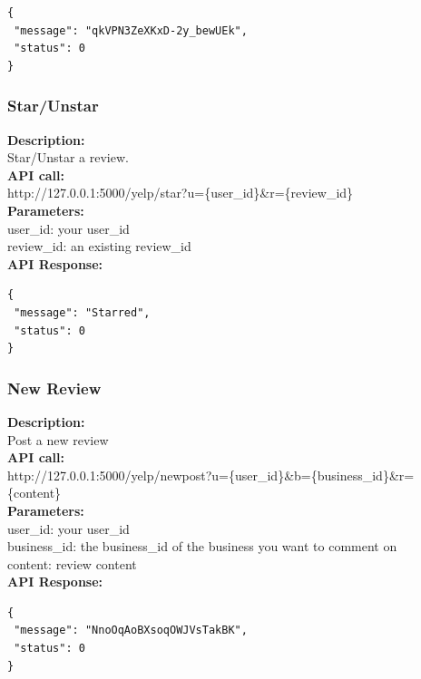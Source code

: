\documentclass[12pt]{article}
\begin{document}
\begin{singlespacing}
\begin{lstlisting}
{
 "message": "qkVPN3ZeXKxD-2y_bewUEk",
 "status": 0
}
\end{lstlisting}
\end{singlespacing}

\subsubsection{Star/Unstar}
\textbf{Description:}\\
Star/Unstar a review.\\
\textbf{API call:}\\
http://127.0.0.1:5000/yelp/star?u=\{user\_id\}\&r=\{review\_id\}\\
\textbf{Parameters:}\\
user\_id: your user\_id\\
review\_id: an existing review\_id\\
\textbf{API Response:}

\begin{singlespacing}
\begin{lstlisting}
{
 "message": "Starred",
 "status": 0
}
\end{lstlisting}
\end{singlespacing}

\subsubsection{New Review}
\textbf{Description:}\\
Post a new review\\
\textbf{API call:}\\
http://127.0.0.1:5000/yelp/newpost?u=\{user\_id\}\&b=\{business\_id\}\&r=\{content\}\\
\textbf{Parameters:}\\
user\_id: your user\_id\\
business\_id: the business\_id of the business you want to comment on\\
content: review content\\
\textbf{API Response:}

\begin{singlespacing}
\begin{lstlisting}
{
 "message": "NnoOqAoBXsoqOWJVsTakBK",
 "status": 0
}
\end{lstlisting}
\end{singlespacing}
\end{document}
